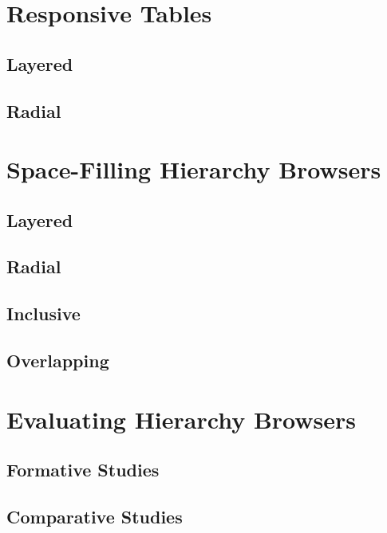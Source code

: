 \section{Responsive Tables}



\subsection{Layered}

\subsection{Radial}





\section{Space-Filling Hierarchy Browsers}

\subsection{Layered}

\subsection{Radial}

\subsection{Inclusive}

\subsection{Overlapping}






\section{Evaluating Hierarchy Browsers}

\subsection{Formative Studies}

\subsection{Comparative Studies}


